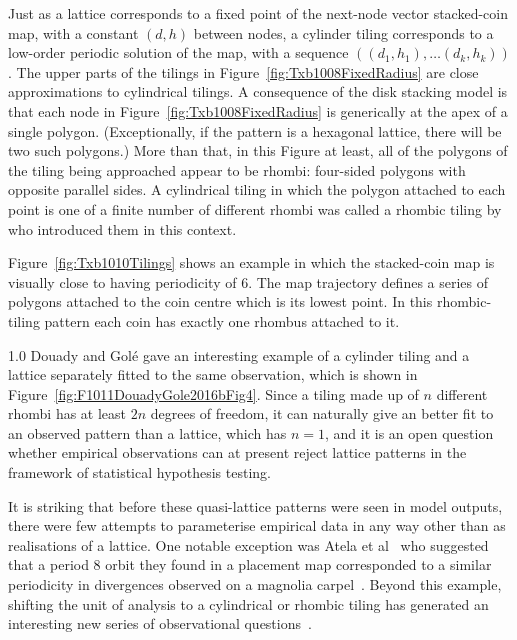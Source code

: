 Just as a lattice corresponds to a fixed point of the next-node vector stacked-coin map, with a constant $(d,h)$ between nodes, a cylinder tiling corresponds to a low-order periodic solution of the map, with a sequence $((d_1,h_1),\ldots (d_k,h_k) )$. The upper parts of the tilings in Figure~\ref{fig:Txb1008FixedRadius} are close approximations to cylindrical tilings.
A consequence of the disk stacking model is that each node in Figure~\ref{fig:Txb1008FixedRadius} is generically at the apex of a single polygon. (Exceptionally, if the pattern is a hexagonal lattice, there will be two such polygons.)
More than that, in this Figure at least, all of the polygons of the tiling being approached appear to be rhombi: four-sided polygons with opposite parallel sides.%
A cylindrical tiling in which the polygon attached to each point is one of a finite number of different rhombi was called a rhombic tiling by~\cite{atelaRhombicTilingsPrimordia2017} who introduced them in this context.

Figure~\ref{fig:Txb1010Tilings} shows an example in which the stacked-coin map is visually close to having periodicity of 6. The map trajectory defines a series of polygons attached to the coin centre which is its lowest point. In this rhombic-tiling pattern each coin has exactly one rhombus attached to it.


%
	{1.0} 
Douady and Gol\'e  gave an interesting example of a cylinder tiling and a lattice separately fitted to the same observation, which is shown in Figure~\ref{fig:F1011DouadyGole2016bFig4}. Since a tiling made up of $n$ different rhombi has at least $2n$ degrees of freedom, it can naturally give an better fit to an observed pattern than a lattice, which has $n=1$, and it is an open question whether empirical observations can at present reject lattice patterns in the framework of statistical hypothesis testing.%

It is striking that before these quasi-lattice patterns were seen in model outputs, there were few attempts to parameterise empirical data in any way other than as realisations of a lattice. One notable exception was Atela et al~\cite{atelaDynamicalSystemPlant2002} who suggested that a period 8 orbit they found in a placement map corresponded to a similar periodicity in divergences observed on a magnolia carpel~\cite{tuckerPhyllotaxisVascularOrganization1961}. 
Beyond this example, shifting the unit of analysis to a cylindrical or rhombic tiling has generated an interesting new series of observational questions~\autocite{douadyFibonacciQuasisymmetricPhyllotaxis2016}.


